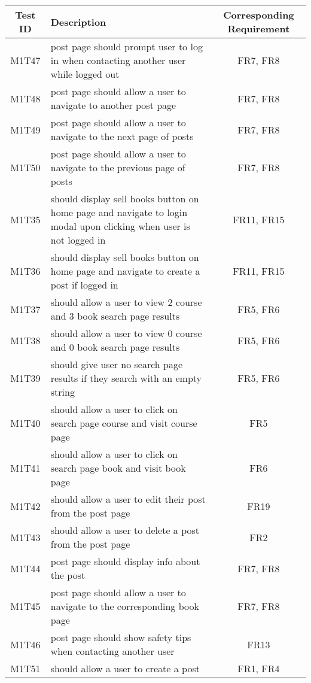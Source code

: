 \documentclass[fullpage]{article}
\begin{document}
\begin{table}[H]
\flushleft
\begin{tabular}{|c|p{8.5cm}|c|}
\hline
 \rowcolor{lightgray}
\textbf{Test ID} &\textbf{Description} &\textbf{Corresponding Requirement}\\
\hline
M1T47 & post page should prompt user to log in when contacting another user while logged out & FR7, FR8 \\
\hline
M1T48 & post page should allow a user to navigate to another post page & FR7, FR8 \\
\hline
M1T49 & post page should allow a user to navigate to the next page of posts & FR7, FR8 \\
\hline
M1T50 & post page should allow a user to navigate to the previous page of posts & FR7, FR8 \\
\hline
M1T35 & should display sell books button on home page and navigate to login modal upon clicking when user is not logged in & FR11, FR15 \\
\hline
M1T36 & should display sell books button on home page and navigate to create a post if logged in & FR11, FR15 \\
\hline
M1T37 & should allow a user to view 2 course and 3 book search page results & FR5, FR6 \\
\hline
M1T38 & should allow a user to view 0 course and 0 book search page results & FR5, FR6 \\
\hline
M1T39 & should give user no search page results if they search with an empty string & FR5, FR6 \\
\hline
M1T40 & should allow a user to click on search page course and visit course page & FR5 \\
\hline
M1T41 & should allow a user to click on search page book and visit book page & FR6 \\
\hline
M1T42 & should allow a user to edit their post from the post page & FR19 \\
\hline
M1T43 & should allow a user to delete a post from the post page & FR2 \\
\hline
M1T44 & post page should display info about the post & FR7, FR8 \\
\hline
M1T45 & post page should allow a user to navigate to the corresponding book page & FR7, FR8 \\
\hline
M1T46 & post page should show safety tips when contacting another user & FR13  \\
\hline
M1T51 & should allow a user to create a post & FR1, FR4 \\
\hline
\end{tabular}
\end{table}
\end{document}
